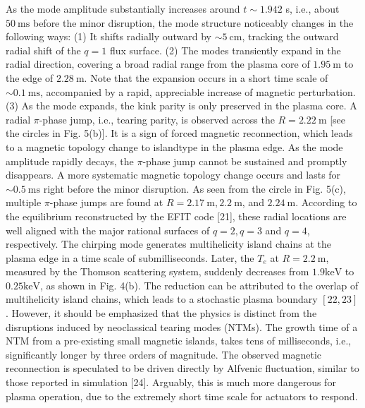\documentclass[oneside,onecolumn]{article}
\begin{document}
\begin{sloppypar}
 
 As the mode amplitude substantially increases around $t \sim 1.942$ s, i.e., about $50 \mathrm{~ms}$ before the minor disruption, the mode structure noticeably changes in the following ways: (1) It shifts radially outward by $\sim 5 \mathrm{~cm}$, tracking the outward radial shift of the $q=1$ flux surface. (2) The modes transiently expand in the radial direction, covering a broad radial range from the plasma core of $1.95 \mathrm{~m}$ to the edge of $2.28 \mathrm{~m}$. Note that the expansion occurs in a short time scale of $\sim 0.1 \mathrm{~ms}$, accompanied by a rapid, appreciable increase of magnetic perturbation. (3) As the mode expands, the kink parity is only preserved in the plasma core. A radial $\pi$-phase jump, i.e., tearing parity, is observed across the $R=2.22 \mathrm{~m}$ [see the circles in Fig. 5(b)]. It is a sign of forced magnetic reconnection, which leads to a magnetic topology change to islandtype in the plasma edge. As the mode amplitude rapidly decays, the $\pi$-phase jump cannot be sustained and promptly disappears. A more systematic magnetic topology change occurs and lasts for $\sim 0.5 \mathrm{~ms}$ right before the minor disruption. As seen from the circle in Fig. 5(c), multiple $\pi$-phase jumps are found at $R=2.17 \mathrm{~m}, 2.2 \mathrm{~m}$, and $2.24 \mathrm{~m}$. According to the equilibrium reconstructed by the EFIT code [21], these radial locations are well aligned with the major rational surfaces of $q=2, q=3$ and $q=4$, respectively. The chirping mode generates multihelicity island chains at the plasma edge in a time scale of submilliseconds. Later, the $T_{e}$ at $R=2.2 \mathrm{~m}$, measured by the Thomson scattering system, suddenly decreases from $1.9 \mathrm{keV}$ to $0.25 \mathrm{keV}$, as shown in Fig. 4(b). The reduction can be attributed to the overlap of multihelicity island chains, which leads to a stochastic plasma boundary $[22,23]$. However, it should be emphasized that the physics is distinct from the disruptions induced by neoclassical tearing modes (NTMs). The growth time of a NTM from a pre-existing small magnetic islands, takes tens of milliseconds, i.e., significantly longer by three orders of magnitude. The observed magnetic reconnection is speculated to be driven directly by Alfvenic fluctuation, similar to those reported in simulation [24]. Arguably, this is much more dangerous for plasma operation, due to the extremely short time scale for actuators to respond.
 

\end{sloppypar}
\end{document}
